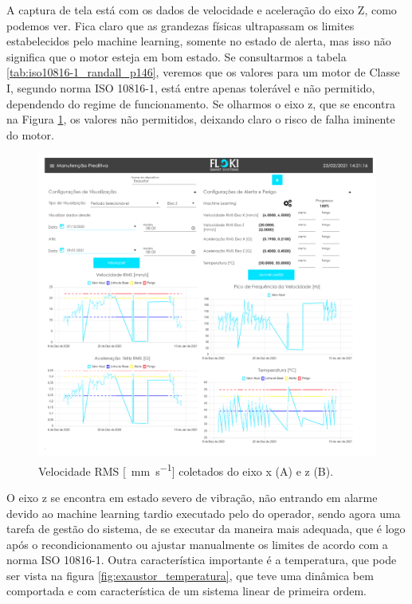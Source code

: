 A captura de tela está com os dados de velocidade e aceleração do eixo Z, como podemos ver. Fica claro que as grandezas físicas
ultrapassam os limites estabelecidos pelo machine learning, somente no estado de alerta, mas isso não significa que o motor esteja em bom estado.
Se consultarmos a tabela \ref{tab:iso10816-1_randall_p146}, veremos que os valores para um motor de Classe I, segundo norma  ISO 10816-1, está 
entre apenas tolerável e não permitido, dependendo do regime de funcionamento. 
Se olharmos o eixo z, que se encontra na Figura \ref{fig:exaustor_xz}, os valores não permitidos, deixando claro o risco de falha iminente do 
motor.

\begin{figure}[H]
    \caption{Velocidade RMS [\SI{}{\milli\metre\per\second}] coletados do eixo x (A) e z (B).}
    \begin{center}
        \includegraphics[scale=0.65, page=2]{resultados/img/resultados.pdf}
    \end{center}
    \label{fig:exaustor_xz}
\end{figure}

O eixo z se encontra em estado severo de vibração, não entrando em alarme devido ao machine learning tardio executado
pelo do operador, sendo agora uma tarefa de gestão do sistema, de se executar da maneira mais adequada, que é logo após o recondicionamento 
ou ajustar manualmente os limites de acordo com a norma ISO 10816-1. Outra característica importante é a temperatura, que pode ser vista na 
figura \ref{fig:exaustor_temperatura}, que teve uma dinâmica bem comportada e com característica de um sistema linear de primeira ordem.


